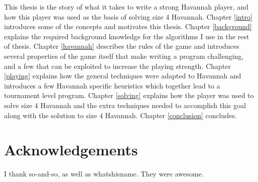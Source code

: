 This thesis is the story of what it takes to write a strong Havannah player, and how this player was used as the basis of solving size 4 Havannah. Chapter \ref{intro} introduces some of the concepts and motivates this thesis. Chapter \ref{background} explains the required background knowledge for the algorithms I use in the rest of thesis. Chapter \ref{havannah} describes the rules of the game and introduces several properties of the game itself that make writing a program challenging, and a few that can be exploited to increase the playing strength. Chapter \ref{playing} explains how the general techniques were adapted to Havannah and introduces a few Havannah specific heuristics which together lead to a tournament level program. Chapter \ref{solving} explains how the player was used to solve size 4 Havannah and the extra techniques needed to accomplish this goal along with the solution to size 4 Havannah. Chapter \ref{conclusion} concludes.



  \newpage 
   \chapter*{Acknowledgements}
   \thispagestyle{empty}
   \vspace*{-0.7in}
   \small{
  I thank so-and-so, as well as whatshisname. They were awesome.
  }